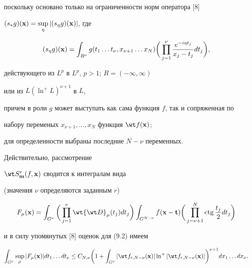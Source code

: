 поскольку основано только на ограниченности норм оператора [8]


$(s_* g)({\bold x})=\sup\limits_{\eta}|(s_\eta g)({\bold x})|$, где


\begin{equation}


(s_\eta g)({\bold x})=\int_{R^ {\nu}}


g(t_1\dotsc t_\nu,x_{\nu +1}\dotsc x_N)


\bigg(\prod_{j=1}^\nu \frac {e^{-i\eta t_j}}{x_j-t_j} dt_j\bigg),


\end{equation}


действующего из $L^p$ в $L^p$, $p>1$; $R=(-\infty,\infty)$


или из $L(\ln^+L)^{\nu +1}$ в $L$,


причем в роли $g$ может выступать как сама функция $f$, так и сопряженная по


набору переменых $x_{\nu+1},\dotsc,x_N$ функция $\wt f ({\bold x})$; 


для определенности выбраны последние $N-\nu$ переменных.





Действительно, рассмотрение


$\wt S^r_{{\bold m}} (f,{\bold x})$ сводится к интегралам вида


(значения $\nu$ определяются заданным $r$)


\begin{equation}


F_\mu({\bold x})=\int_{G^\nu}


\bigg(\prod_{j=1}^\nu \wt{\wt D}_\mu (t_j)


dt_j\bigg)\int_{G^{N-\nu}}


f({\bold x}-{\bold t})\bigg(\prod_{j=\nu+1}^N \ctg \frac{t_j}{2}dt_j\bigg)


\end{equation}


и в силу упомянутых [8] оценок для (9.2) имеем


\begin{equation}


\int_{G^{\nu}} \sup_\mu |F_\mu({\bold x})|dt_1\dotsc dt_\nu


\le C_{N,\nu}\bigg(1+\int_{G^{\nu}} |\wt f_{r,N-\nu}({\bold x})|


\ln^+|\wt f_{r,N-\nu}({\bold x})|\bigg)^{\nu+1}dx_1\dotsc dx_\nu.


\end{equation}


